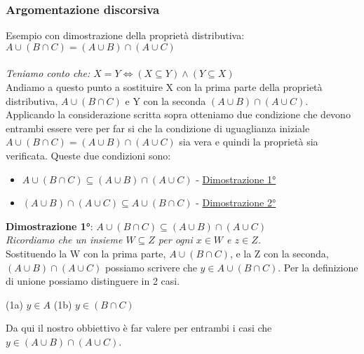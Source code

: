 \subsubsection{Argomentazione discorsiva}
Esempio con dimostrazione della proprietà distributiva: $A \cup (B \cap C) = (A \cup B) \cap (A \cup C)$ \\ \\
\textit{Teniamo conto che: $X = Y \iff (X \subseteq Y) \land (Y \subseteq X)$} \\
Andiamo a questo punto a sostituire X con la prima parte della proprietà distributiva, $A \cup (B \cap C)$ e Y con la seconda $(A \cup B) \cap (A \cup C)$. 
Applicando la considerazione scritta sopra otteniamo due condizione che devono entrambi essere vere per far si che la condizione di uguaglianza iniziale $A \cup (B \cap C) = (A \cup B) \cap (A \cup C)$ sia vera e quindi la proprietà sia verificata. Queste due condizioni sono:
\begin{itemize}
    \item $A \cup (B \cap C) \subseteq (A \cup B) \cap (A \cup C)$ - \underline{Dimostrazione 1°}
    \item $(A \cup B) \cap (A \cup C) \subseteq A \cup (B \cap C)$ - \underline{Dimostrazione 2°}
\end{itemize}
\textbf{Dimostrazione 1°}: $A \cup (B \cap C) \subseteq (A \cup B) \cap (A \cup C)$\\
\textit{Ricordiamo che un insieme $W \subseteq Z$ per ogni $x \in W$ e $z \in Z$.}\\
Sostituendo la W con la prima parte, $A \cup (B \cap C)$, e la Z con la seconda, $(A \cup B) \cap (A \cup C)$ possiamo scrivere che $y \in A \cup (B \cap C)$. Per la definizione di unione possiamo distinguere in 2 casi.
\begin{center}
    (1a) $y \in A$ \hspace{.5cm}  (1b) $y \in (B \cap C)$ \\
\end{center}
Da qui il nostro obbiettivo è far valere per entrambi i casi che $y \in (A \cup B) \cap (A \cup C)$.
